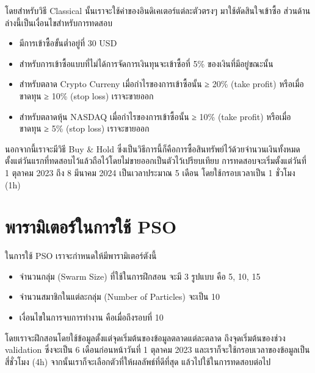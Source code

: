 โดยสำหรับวิธี Classical นั้นเราจะใช้ค่าของอินดิเคเตอร์แต่ละตัวตรงๆ มาใช้ตัดสินใจเข้าซื้อ ส่วนด้านล่างนี้เป็นเงื่อนไขสำหรับการทดสอบ

\begin{itemize}
    \item {มีการเข้าซื้อขั้นต่ำอยู่ที่ 30 USD}
    \item {สำหรับการเข้าซื้อแบบที่ไม่ได้การจัดการเงินทุนจะเข้าซื้อที่ 5\% ของเงินที่มีอยู่ขณะนั้น}
    \item {สำหรับตลาด Crypto Curreny เมื่อกำไรของการเข้าซื้อนั้น ≥ 20\% (take profit) หรือเมื่อขาดทุน ≥ 10\% (stop loss) เราจะขายออก}
    \item {สำหรับตลาดหุ้น NASDAQ เมื่อกำไรของการเข้าซื้อนั้น ≥ 10\% (take profit) หรือเมื่อขาดทุน ≥ 5\% (stop loss) เราจะขายออก}
\end{itemize}
นอกจากนี้เราจะมีวิธี Buy \& Hold ซึ่งเป็นวิธีการนี้ก็คือการซื้อสินทรัพย์ไว้ด้วยจำนวนเงินทั้งหมด ตั้งแต่วันแรกที่ทดสอบไว้แล้วถือไว้โดยไม่ขายออกเป็นตัวไว้เปรียบเทียบ การทดสอบจะเริ่มตั้งแต่วันที่ 1 ตุลาคม 2023 ถึง 8 มีนาคม 2024 เป็นเวลาประมาณ 5 เดือน โดยใช้กรอบเวลาเป็น 1 ชั่วโมง (1h)

\section{พารามิเตอร์ในการใช้ PSO}
ในการใช้ PSO เราจะกำหนดให้มีพารามิเตอร์ตังนี้
\begin{itemize}
    \item {จำนวนกลุ่ม (Swarm Size) ที่ใช้ในการฝึกสอน จะมี 3 รูปแบบ คือ 5, 10, 15}
    \item {จำนวนสมาชิกในแต่ละกลุ่ม (Number of Particles) จะเป็น 10}
    \item {เงื่อนไขในการจบการทำงาน คือเมื่อถึงรอบที่ 10}
\end{itemize}
โดยเราจะฝึกสอนโดยใช้ข้อมูลตั้งแต่จุดเริ่มต้นของข้อมูลตลาดแต่ละตลาด ถึงจุดเริ่มต้นของช่วง validation ซึ่งจะเป็น 6 เดือนก่อนหน้าวันที่ 1 ตุลาคม 2023 และเราก็จะใช้กรอบเวลาของข้อมูลเป็นสี่ชั่วโมง (4h) จากนั้นเราก็จะเลือกตัวที่ให้ผลลัพธ์ที่ดีที่สุด แล้วไปใช้ในการทดสอบต่อไป

